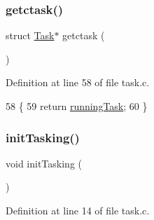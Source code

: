\mbox{\label{a00047_a5913e9b2190b2b4118ee020721a320e2_a5913e9b2190b2b4118ee020721a320e2}} 
\subsubsection{\texorpdfstring{getctask()}{getctask()}}
{\footnotesize\ttfamily struct \hyperlink{a00136}{Task}$\ast$ getctask (\begin{DoxyParamCaption}{ }\end{DoxyParamCaption})}



Definition at line 58 of file task.\+c.


\begin{DoxyCode}
58                         \{
59     \textcolor{keywordflow}{return} \hyperlink{a00047_a2c195d425b4a6791b3a89f7b219f93d9_a2c195d425b4a6791b3a89f7b219f93d9}{runningTask};
60 \}
\end{DoxyCode}
\mbox{\label{a00047_aea945e91746a54801f4763ad264746b9_aea945e91746a54801f4763ad264746b9}} 
\subsubsection{\texorpdfstring{init\+Tasking()}{initTasking()}}
{\footnotesize\ttfamily void init\+Tasking (\begin{DoxyParamCaption}{ }\end{DoxyParamCaption})}



Definition at line 14 of file task.\+c.


